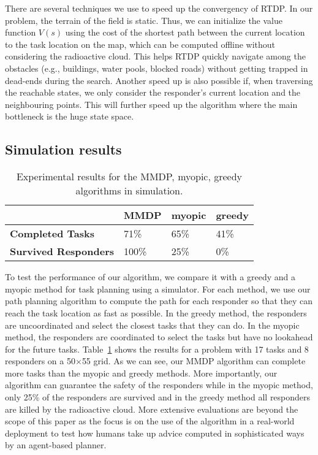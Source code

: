 There are several techniques we use to speed up the convergency of
RTDP. In our problem, the terrain of the field is static. Thus, we
can initialize the value function $V(s)$ using the cost of the
shortest path between the current location to the task location on
the map, which can be computed offline without considering the
radioactive cloud. This helps RTDP quickly navigate among the
obstacles (e.g., buildings, water pools, blocked roads) without
getting trapped in dead-ends during the search. Another speed up is
also possible if, when traversing the reachable states, we only
consider the responder's current location and the neighbouring
points. This will further speed up the algorithm where the main
bottleneck is the huge state space.

\subsection{Simulation results}


\begin{table}[htbp]
  \centering\vspace{-15pt}
  \caption{Experimental results for the MMDP, myopic, greedy
  algorithms in simulation.}
  \begin{tabular}{|l||l|l|l|}
  \hline
   & {\bf MMDP} & {\bf myopic} & {\bf greedy} \\
  \hline\hline
  {\bf Completed Tasks} & 71\% & 65\% & 41\% \\
  \hline
  {\bf Survived Responders} & 100\% & 25\% & 0\% \\
  \hline
  \end{tabular}
  \label{tab:simulation}
\end{table}

\noindent To test the performance of our algorithm, we compare it
with a greedy and a myopic method for task planning using a
simulator. For each method, we use our path planning algorithm to
compute the path for each responder so that they can reach the task
location as fast as possible. In the greedy method, the responders
are uncoordinated and select the closest tasks that they can do. In
the myopic method, the responders are coordinated to select the
tasks but have no lookahead for the future tasks.
Table~\ref{tab:simulation} shows the results for a problem with 17
tasks and 8 responders on a 50$\times$55 grid. As we can see, our
MMDP algorithm can complete more tasks than the myopic and greedy
methods. More importantly, our algorithm can guarantee the safety
of the responders while in the myopic method, only 25\% of the
responders are survived and in the greedy method all responders are
killed by the radioactive cloud. More extensive evaluations are
beyond the scope of this paper as the focus is on the use of the
algorithm in a real-world deployment to test how humans take up
advice computed in sophisticated ways by an agent-based planner.
